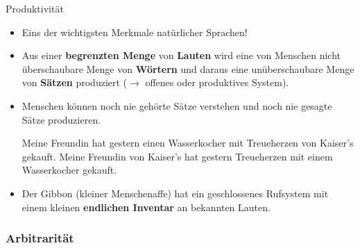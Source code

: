 \begin{frame}{Produktivität}
	
	\begin{itemize}
		\item<1-> Eins der wichtigsten Merkmale natürlicher Sprachen!
		\item<2-> Aus einer \textbf{begrenzten Menge} von \textbf{Lauten} wird eine von
                  Menschen nicht überschaubare Menge von \textbf{Wörtern} und daraus eine unüberschaubare Menge von \textbf{Sätzen} produziert ($\rightarrow$ offenes oder produktives System).
		\item<2-> Menschen können noch nie gehörte Sätze verstehen und noch nie gesagte Sätze produzieren.

\pause

\ea Meine Freundin hat gestern einen Wasserkocher mit Treueherzen von Kaiser's gekauft.
\ex Meine Freundin von Kaiser's hat gestern Treueherzen mit einem Wasserkocher gekauft.
\z
				
	\item<3-> Der Gibbon (kleiner Menschenaffe) hat ein geschlossenes Rufsystem mit einem kleinen \textbf{endlichen Inventar} an bekannten Lauten. 
	
	\end{itemize}
\end{frame}


\subsubsection{Arbitrarität}

